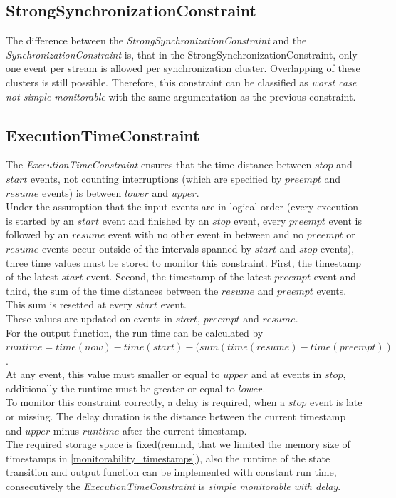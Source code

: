 	
\subsection{StrongSynchronizationConstraint}
	The difference between the \emph{StrongSynchronizationConstraint} and the \emph{SynchronizationConstraint} is, that in the StrongSynchronizationConstraint, only one event per stream is allowed per synchronization cluster. Overlapping of these clusters is still possible. Therefore, this constraint can be classified as \textit{worst case not simple monitorable} with the same argumentation as the previous constraint.
	
	
\subsection{ExecutionTimeConstraint}
	The \emph{ExecutionTimeConstraint} ensures that the time distance between $stop$ and $start$ events, not counting interruptions (which are specified by $preempt$ and $resume$ events) is between $lower$ and $upper$.\\
	Under the assumption that the input events are in logical order (every execution is started by an $start$ event and finished by an $stop$ event, every $preempt$ event is followed by an $resume$ event with no other event in between and no $preempt$ or $resume$ events occur outside of the intervals spanned by $start$ and $stop$ events), three time values must be stored to monitor this constraint. First, the timestamp of the latest $start$ event. Second, the timestamp of the latest $preempt$ event and third, the sum of the time distances between the $resume$ and $preempt$ events. This sum is resetted at every $start$ event.\\
	These values are updated on events in $start$, $preempt$ and $resume$.\\
	For the output function, the run time can be calculated by\\ $runtime = time(now) - time(start) - (sum(time(resume) - time(preempt))$.\\ At any event, this value must smaller or equal to $upper$ and at events in $stop$, additionally the runtime must be greater or equal to $lower$. \\
	To monitor this constraint correctly, a delay is required, when a $stop$ event is late or missing. The delay duration is the distance between the current timestamp and $upper$ minus $runtime$ after the current timestamp.\\
	The required storage space is fixed(remind, that we limited the memory size of timestamps in \ref{monitorability_timestamps}), also the runtime of the state transition and output function can be implemented with constant run time, consecutively the \emph{ExecutionTimeConstraint} is \textit{simple monitorable with delay}.



